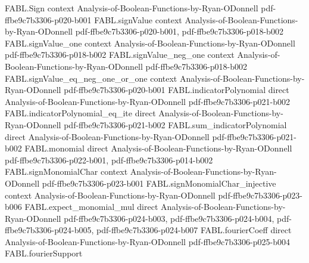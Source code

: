 \begin{theorem}
\label{FABL.relativeHammingDist_signedDictator_family_isBigO_of_condorcetWinnerProbability_eq_one_sub}
\leanok
{}
\proofstep
  {FABL.Sign}
  {context}
  {Analysis-of-Boolean-Functions-by-Ryan-ODonnell}
  {pdf-ffbe9c7b3306-p020-b001}
\proofstep
  {FABL.signValue}
  {context}
  {Analysis-of-Boolean-Functions-by-Ryan-ODonnell}
  {pdf-ffbe9c7b3306-p020-b001,
    pdf-ffbe9c7b3306-p018-b002}
\proofstep
  {FABL.signValue_one}
  {context}
  {Analysis-of-Boolean-Functions-by-Ryan-ODonnell}
  {pdf-ffbe9c7b3306-p018-b002}
\proofstep
  {FABL.signValue_neg_one}
  {context}
  {Analysis-of-Boolean-Functions-by-Ryan-ODonnell}
  {pdf-ffbe9c7b3306-p018-b002}
\proofstep
  {FABL.signValue_eq_neg_one_or_one}
  {context}
  {Analysis-of-Boolean-Functions-by-Ryan-ODonnell}
  {pdf-ffbe9c7b3306-p020-b001}
\proofstep
  {FABL.indicatorPolynomial}
  {direct}
  {Analysis-of-Boolean-Functions-by-Ryan-ODonnell}
  {pdf-ffbe9c7b3306-p021-b002}
\proofstep
  {FABL.indicatorPolynomial_eq_ite}
  {direct}
  {Analysis-of-Boolean-Functions-by-Ryan-ODonnell}
  {pdf-ffbe9c7b3306-p021-b002}
\proofstep
  {FABL.sum_indicatorPolynomial}
  {direct}
  {Analysis-of-Boolean-Functions-by-Ryan-ODonnell}
  {pdf-ffbe9c7b3306-p021-b002}
\proofstep
  {FABL.monomial}
  {direct}
  {Analysis-of-Boolean-Functions-by-Ryan-ODonnell}
  {pdf-ffbe9c7b3306-p022-b001,
    pdf-ffbe9c7b3306-p014-b002}
\proofstep
  {FABL.signMonomialChar}
  {context}
  {Analysis-of-Boolean-Functions-by-Ryan-ODonnell}
  {pdf-ffbe9c7b3306-p023-b001}
\proofstep
  {FABL.signMonomialChar_injective}
  {context}
  {Analysis-of-Boolean-Functions-by-Ryan-ODonnell}
  {pdf-ffbe9c7b3306-p023-b006}
\proofstep
  {FABL.expect_monomial_mul}
  {direct}
  {Analysis-of-Boolean-Functions-by-Ryan-ODonnell}
  {pdf-ffbe9c7b3306-p024-b003,
    pdf-ffbe9c7b3306-p024-b004,
    pdf-ffbe9c7b3306-p024-b005,
    pdf-ffbe9c7b3306-p024-b007}
\proofstep
  {FABL.fourierCoeff}
  {direct}
  {Analysis-of-Boolean-Functions-by-Ryan-ODonnell}
  {pdf-ffbe9c7b3306-p025-b004}
\proofstep
  {FABL.fourierSupport}

\end{theorem}
